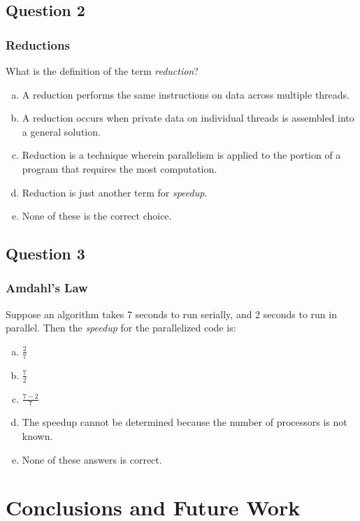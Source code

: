 \documentclass[table]{beamer}
\begin{document}
\subsection{Question 2}

\begin{frame}
    \frametitle{Reductions}
    What is the definition of the term \emph{reduction}?

    \begin{enumerate}[(a)]
        \item A reduction performs the same instructions on data
            across multiple threads.
        \item A reduction occurs when private data on individual
            threads is assembled into a general solution.
        \item Reduction is a technique wherein parallelism is
            applied to the portion of a program that requires
            the most computation. 
        \item Reduction is just another term for {\em speedup}.
        \item None of these is the correct choice.
    \end{enumerate}
\end{frame}

\subsection{Question 3}

\begin{frame}
    \frametitle{Amdahl's Law}
    Suppose an algorithm takes 7 seconds to run serially, and 2 seconds to run
    in parallel.  Then the {\em speedup} for the parallelized code is:

    \begin{enumerate}[(a)]
        \item $\frac{2}{7}$
        \item $\frac{7}{2}$
        \item $\frac{7-2}{7}$
        \item The speedup cannot be determined because the number of processors is not known.
        \item None of these answers is correct.
\end{enumerate}
\end{frame}

\section{Conclusions and Future Work}
\end{document}
